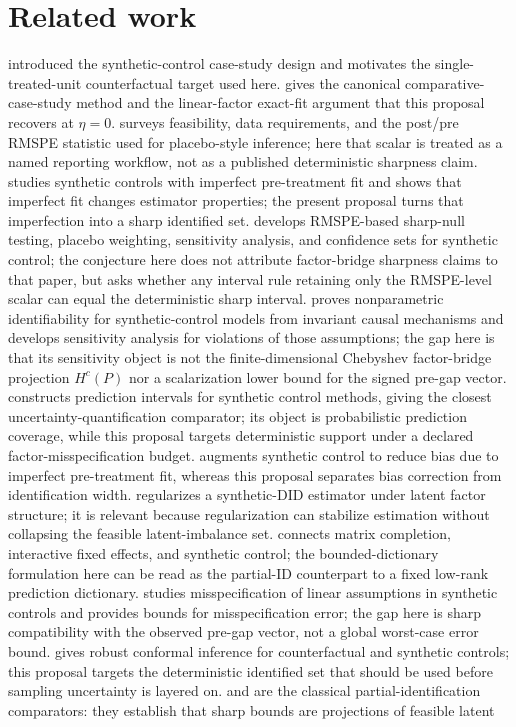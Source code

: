 \documentclass[11pt]{article}
\theoremstyle{definition}
\theoremstyle{plain}
\theoremstyle{remark}
\begin{document}
\section{Related work}
\citet{AbadieGardeazabal2003} introduced the synthetic-control case-study design and motivates the single-treated-unit counterfactual target used here. \citet{AbadieDiamondHainmueller2010} gives the canonical comparative-case-study method and the linear-factor exact-fit argument that this proposal recovers at \(\eta=0\). \citet{Abadie2021} surveys feasibility, data requirements, and the post/pre RMSPE statistic used for placebo-style inference; here that scalar is treated as a named reporting workflow, not as a published deterministic sharpness claim. \citet{FermanPinto2021} studies synthetic controls with imperfect pre-treatment fit and shows that imperfect fit changes estimator properties; the present proposal turns that imperfection into a sharp identified set. \citet{FirpoPossebom2018} develops RMSPE-based sharp-null testing, placebo weighting, sensitivity analysis, and confidence sets for synthetic control; the conjecture here does not attribute factor-bridge sharpness claims to that paper, but asks whether any interval rule retaining only the RMSPE-level scalar can equal the deterministic sharp interval. \citet{ZeitlerVlontzosGilliganLee2023} proves nonparametric identifiability for synthetic-control models from invariant causal mechanisms and develops sensitivity analysis for violations of those assumptions; the gap here is that its sensitivity object is not the finite-dimensional Chebyshev factor-bridge projection \(H^c(P)\) nor a scalarization lower bound for the signed pre-gap vector. \citet{CattaneoFengTitiunik2021} constructs prediction intervals for synthetic control methods, giving the closest uncertainty-quantification comparator; its object is probabilistic prediction coverage, while this proposal targets deterministic support under a declared factor-misspecification budget. \citet{BenMichaelFellerRothstein2021} augments synthetic control to reduce bias due to imperfect pre-treatment fit, whereas this proposal separates bias correction from identification width. \citet{ArkhangelskyAtheyHirshbergImbensWager2021} regularizes a synthetic-DID estimator under latent factor structure; it is relevant because regularization can stabilize estimation without collapsing the feasible latent-imbalance set. \citet{AtheyBayatiDoudchenkoImbensKhosravi2021} connects matrix completion, interactive fixed effects, and synthetic control; the bounded-dictionary formulation here can be read as the partial-ID counterpart to a fixed low-rank prediction dictionary. \citet{NazaretShiBlei2024} studies misspecification of linear assumptions in synthetic controls and provides bounds for misspecification error; the gap here is sharp compatibility with the observed pre-gap vector, not a global worst-case error bound. \citet{ChernozhukovWuthrichZhu2021} gives robust conformal inference for counterfactual and synthetic controls; this proposal targets the deterministic identified set that should be used before sampling uncertainty is layered on. \citet{Manski1990} and \citet{BalkePearl1997} are the classical partial-identification comparators: they establish that sharp bounds are projections of feasible latent 
\end{document}
